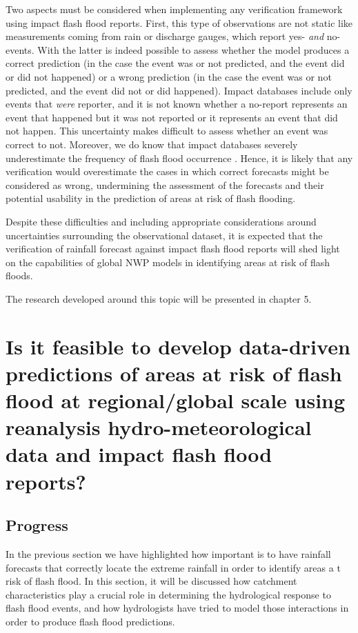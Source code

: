 Two aspects must be considered when implementing any verification framework using impact flash flood reports. First, this type of observations are not static like measurements coming from rain or discharge gauges, which report yes- \textit{and} no-events. With the latter is indeed possible to assess whether the model produces a correct prediction (in the case the event was or not predicted, and the event did or did not happened) or a wrong prediction (in the case the event was or not predicted, and the event did not or did happened). Impact databases include only events that \textit{were} reporter, and it is not known whether a no-report represents an event that happened but it was not reported or it represents an event that did not happen. This uncertainty makes difficult to assess whether an event was correct to not. Moreover, we do know that impact databases severely underestimate the frequency of flash flood occurrence \citep{Panwar_2020}. Hence, it is likely that any verification would overestimate the cases in which correct forecasts might be considered as wrong, undermining the assessment of the forecasts and their potential usability in the prediction of areas at risk of flash flooding. 

Despite these difficulties and including appropriate considerations around uncertainties surrounding the observational dataset, it is expected that the verification of rainfall forecast against impact flash flood reports will shed light on the capabilities of global NWP models in identifying areas at risk of flash floods. 

The research developed around this topic will be presented in chapter 5. 


\section{Is it feasible to develop data-driven predictions of areas at risk of flash flood at regional/global scale using reanalysis hydro-meteorological data and impact flash flood reports?}

\subsection{Progress}

In the previous section we have highlighted how important is to have rainfall forecasts that correctly locate the extreme rainfall in order to identify areas a t risk of flash flood. In this section, it will be discussed how catchment characteristics play a crucial role in determining the hydrological response to flash flood events, and how hydrologists have tried to model those interactions in order to produce flash flood predictions. 

